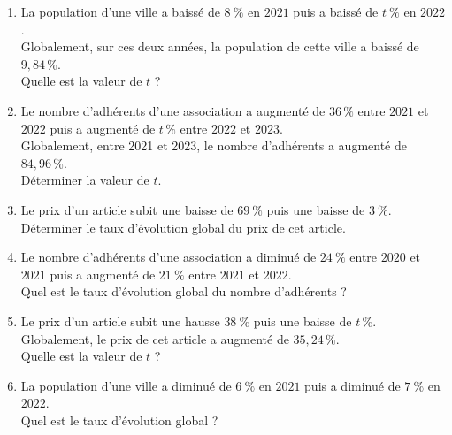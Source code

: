 {\begin{Exercice} %
\leavevmode\vspace{-\baselineskip}
\begin{enumerate}[itemsep=0.4em]
	\item \begin{minipage}[t]{\linewidth}La population d'une ville a baissé de $8~\%$ en $2021$ puis a baissé de $t~\%$ en $2022$.\\
          Globalement, sur ces deux années, la population de cette ville a baissé de $9{,}84 \,\%$.\\
          Quelle est la valeur de $t$ ?\end{minipage}
	\item \begin{minipage}[t]{\linewidth}Le nombre d'adhérents d'une association a augmenté de $36\,\%$ entre $2021$ et $2022$ puis a augmenté de $t\,\%$ entre $2022$ et $2023$.\\
          Globalement, entre 2021 et 2023, le  nombre d'adhérents a augmenté de $84{,}96\,\%$.\\
          Déterminer la valeur de $t$.
          \end{minipage}
	\item \begin{minipage}[t]{\linewidth}Le prix d'un article subit une baisse de $69~\%$ puis une baisse de $3~\%$.\\Déterminer le taux d'évolution global du prix de cet article.\end{minipage}
	\item \begin{minipage}[t]{\linewidth}Le nombre d'adhérents d'une association a diminué de $24~\%$ entre $2020$ et $2021$ puis a augmenté de $21~\%$ entre $2021$ et $2022$.\\Quel est le taux d'évolution global du nombre d'adhérents ?\end{minipage}
	\item \begin{minipage}[t]{\linewidth}Le prix d'un article subit une hausse $38~\%$ puis une baisse de $t\,\%$.\\
          Globalement, le prix de cet article a augmenté de $35{,}24 \,\%$.\\
          Quelle est la valeur de $t$ ?\end{minipage}
	\item \begin{minipage}[t]{\linewidth}La population d'une ville a diminué de $6~\%$ en $2021$ puis a diminué de $7~\%$ en $2022$.\\Quel est le taux d'évolution global ?\end{minipage}
\end{enumerate}
\end{Exercice}

}
